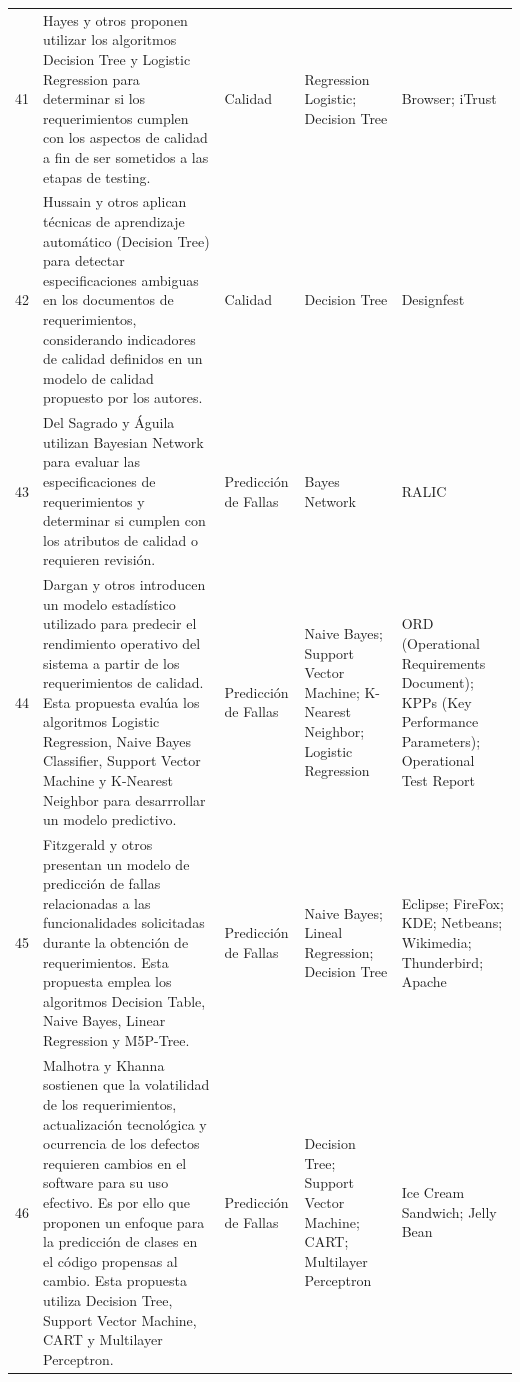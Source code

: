 \documentclass[journal]{IEEEtran}
\begin{document}
\begin{longtable}[c]{p{0.50cm}p{4.5cm}p{2.5cm}p{3cm}p{2.5cm}}
41 & Hayes y otros proponen utilizar los algoritmos Decision Tree y Logistic Regression para determinar si los requerimientos cumplen con los aspectos de calidad a fin de ser sometidos a las etapas de testing. & Calidad & Regression Logistic; Decision Tree & Browser; iTrust \\ \cline{1-5}

42 & Hussain y otros aplican técnicas de aprendizaje automático (Decision Tree) para detectar especificaciones ambiguas en los documentos de requerimientos, considerando indicadores de calidad definidos en un modelo de calidad propuesto por los autores. & Calidad & Decision Tree & Designfest \\ \cline{1-5}

43 & Del Sagrado y Águila utilizan Bayesian Network para evaluar las especificaciones de requerimientos y determinar si cumplen con los atributos de calidad o requieren revisión. & Predicción de Fallas & Bayes Network & RALIC \\ \cline{1-5}

44 & Dargan y otros introducen un modelo estadístico utilizado para predecir el rendimiento operativo del sistema a partir de los requerimientos de calidad.  Esta propuesta evalúa los algoritmos Logistic Regression, Naive Bayes Classifier, Support Vector Machine y K-Nearest Neighbor para desarrrollar un modelo predictivo. & Predicción de Fallas & Naive Bayes; Support Vector Machine; K- Nearest Neighbor; Logistic Regression & ORD (Operational Requirements Document); KPPs (Key Performance Parameters); Operational Test Report \\ \cline{1-5}

45 & Fitzgerald y otros presentan un modelo de predicción de fallas relacionadas a las funcionalidades solicitadas durante la obtención de requerimientos. Esta propuesta emplea los algoritmos Decision Table, Naive Bayes, Linear Regression y M5P-Tree. & Predicción de Fallas & Naive Bayes; Lineal Regression; Decision Tree  & Eclipse; FireFox; KDE; Netbeans; Wikimedia; Thunderbird; Apache \\ \cline{1-5}

46 & Malhotra y Khanna sostienen que la volatilidad de los requerimientos, actualización tecnológica y ocurrencia de los defectos requieren cambios en el software para su uso efectivo. Es por ello que proponen un enfoque para la predicción de clases en el código propensas al cambio. Esta propuesta utiliza Decision Tree, Support Vector Machine, CART y Multilayer Perceptron. & Predicción de Fallas  & Decision Tree; Support Vector Machine; CART; Multilayer Perceptron & Ice Cream Sandwich; Jelly Bean \\ \cline{1-5}


\end{longtable}
\end{document}
